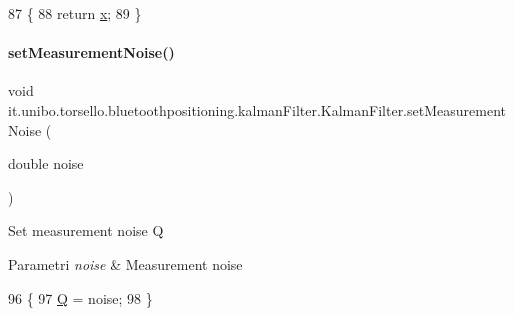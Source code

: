 \begin{DoxyCode}
87                                     \{
88         \textcolor{keywordflow}{return} \hyperlink{classit_1_1unibo_1_1torsello_1_1bluetoothpositioning_1_1kalmanFilter_1_1KalmanFilter_acab8f5b6d2cec6daae8c6e5a300243cd_acab8f5b6d2cec6daae8c6e5a300243cd}{x};
89     \}
\end{DoxyCode}
\hypertarget{classit_1_1unibo_1_1torsello_1_1bluetoothpositioning_1_1kalmanFilter_1_1KalmanFilter_a320315e589b1908f604745e1381c8710_a320315e589b1908f604745e1381c8710}{}\label{classit_1_1unibo_1_1torsello_1_1bluetoothpositioning_1_1kalmanFilter_1_1KalmanFilter_a320315e589b1908f604745e1381c8710_a320315e589b1908f604745e1381c8710} 
\paragraph{\texorpdfstring{set\+Measurement\+Noise()}{setMeasurementNoise()}}
{\footnotesize\ttfamily void it.\+unibo.\+torsello.\+bluetoothpositioning.\+kalman\+Filter.\+Kalman\+Filter.\+set\+Measurement\+Noise (\begin{DoxyParamCaption}\item[{double}]{noise }\end{DoxyParamCaption})}

Set measurement noise Q


\begin{DoxyParams}{Parametri}
{\em noise} & Measurement noise \\
\hline
\end{DoxyParams}

\begin{DoxyCode}
96                                                   \{
97         \hyperlink{classit_1_1unibo_1_1torsello_1_1bluetoothpositioning_1_1kalmanFilter_1_1KalmanFilter_a684136c1ebc53dab2d661e98e7485a0a_a684136c1ebc53dab2d661e98e7485a0a}{Q} = noise;
98     \}
\end{DoxyCode}
\hypertarget{classit_1_1unibo_1_1torsello_1_1bluetoothpositioning_1_1kalmanFilter_1_1KalmanFilter_ad8c1946d417c0b8b1991228ffa02bdd6_ad8c1946d417c0b8b1991228ffa02bdd6}{}\label{classit_1_1unibo_1_1torsello_1_1bluetoothpositioning_1_1kalmanFilter_1_1KalmanFilter_ad8c1946d417c0b8b1991228ffa02bdd6_ad8c1946d417c0b8b1991228ffa02bdd6} 

